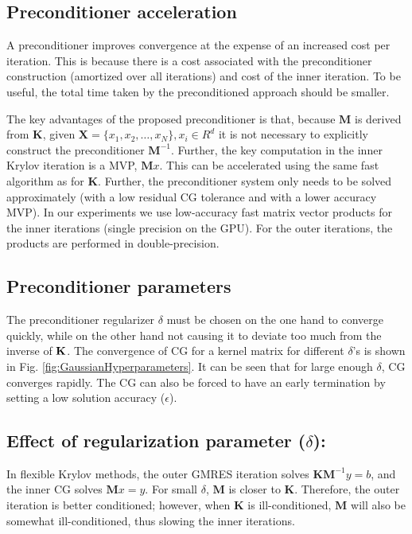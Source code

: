 \documentclass[10pt,journal,letterpaper,compsoc]{IEEEtran}
\begin{document}
\subsection{Preconditioner acceleration}
A preconditioner improves convergence at the expense of an increased cost per iteration. This is because there is a cost associated with the preconditioner construction (amortized over all iterations) and cost of the inner iteration. To be useful, the total time taken by the preconditioned approach should be smaller.

The key advantages of the proposed preconditioner is that, because $\mathbf{M}$ is derived from $\mathbf{K}$, given $\mathbf{X}=\{x_1,x_2,\ldots,x_N\}, x_i\in R^d$ it is not necessary to explicitly construct the preconditioner $\mathbf{M}^{-1}$. Further, the key computation in the inner Krylov iteration is a MVP, $\mathbf{M}x$. This can be accelerated using the same fast algorithm as for $\mathbf{K}$. Further, the preconditioner system only needs to be solved approximately (with a low residual CG tolerance and with a lower accuracy MVP). In our experiments we use low-accuracy fast matrix vector products for the inner iterations (single precision on the GPU). For the outer iterations, the products are performed in double-precision.

\subsection{Preconditioner parameters}
The preconditioner regularizer $\delta$ must be chosen on the one hand to converge quickly, while on the other hand not causing it to deviate too much from the inverse of ${\bf K}$. The convergence of CG for a kernel matrix for different $\delta$'s is shown in Fig. \ref{fig:GaussianHyperparameters}. It can be seen that for large enough $\delta$, CG converges rapidly. The CG can also be forced to have an early termination by setting a low solution accuracy ($\epsilon$).

\subsection{Effect of regularization parameter ($\delta$):} In flexible Krylov methods, the outer GMRES iteration solves $\mathbf{KM}^{-1}y=b$, and the inner CG solves $\mathbf{M}x=y$. For small $\delta$, $\mathbf{M}$ is closer to $\mathbf{K}$. Therefore, the outer iteration is better conditioned; however, when $\mathbf{K}$ is ill-conditioned, $\mathbf{M}$ will also be somewhat ill-conditioned, thus slowing the inner iterations.
\end{document}
